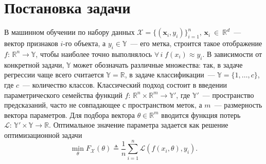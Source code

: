 \documentclass[preprint,12pt]{elsarticle}
\begin{document}
\section{Постановка задачи}
\label{S:1}
В машинном обучении по набору данных $\mathcal{X} = \{(\mathbf{x}_i, y_i)\}_{i=1}^n$, $\mathbf{x}_i~\in~\mathbb{R}^d$~--- вектор признаков $i$-го объекта, а $y_i \in \mathbb{Y}$~--- его метка, строится такое отображение $f\colon \, \mathbb{R}^n \rightarrow \mathbb{Y}$, чтобы наиболее точно выполнялось $\forall\, i \; f(x_i) \approx y_i$. 
В зависимости от конкретной задачи, $\mathbb{Y}$ может обозначать различные множества: так, в задаче регрессии чаще всего считается $\mathbb{Y} = \mathbb{R}$, в задаче классификации~--- $\mathbb{Y} = \{1, \dots, c\}$, где $c$~--- количество классов. 
Классический подход состоит в введении параметрического семейства функций $f\colon \, \mathbb{R}^n \times \mathbb{R}^m \rightarrow \mathbb{Y}'$, где $\mathbb{Y}'$~--- пространство предсказаний, часто не совпадающее с пространством меток, а $m$~--- размерность вектора параметров. 
Для подбора вектора $\theta \in \mathbb{R}^m$ вводится функция потерь $\mathcal{L}\colon \, \mathbb{Y}' \times \mathbb{Y} \rightarrow \mathbb{R}$. 
Оптимальное значение параметра задается как решение оптимизационной задачи
\begin{equation} \label{eq-opt-weight}
    \min_\theta F_\mathcal{X}(\theta) \triangleq \frac1n \sum_{i=1}^n \mathcal{L}(f(x_i, \theta), y_i).
\end{equation}
\end{document}
